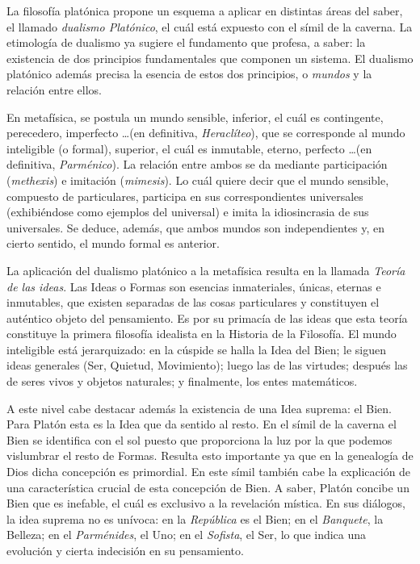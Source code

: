 \documentclass[10pt]{article}
\begin{document}
La filosofía platónica propone un esquema a aplicar en distintas áreas del saber, el llamado \textit{dualismo Platónico}, el cuál está expuesto
con el símil de la caverna. La etimología de dualismo ya sugiere el fundamento que profesa, a saber: la existencia de dos principios fundamentales que
componen un sistema. El dualismo platónico además precisa la esencia de estos dos principios, o \textit{mundos} y la relación entre ellos.

En metafísica, se postula un mundo sensible, inferior, el cuál es contingente, perecedero, imperfecto \dots (en definitiva, \textit{Heraclíteo}), que
se corresponde al mundo inteligible (o formal), superior, el cuál es inmutable, eterno, perfecto \dots (en definitiva, \textit{Parménico}). La relación
entre ambos se da mediante participación (\textit{methexis}) e imitación (\textit{mimesis}).
Lo cuál quiere decir que el mundo sensible, compuesto de particulares, participa en sus correspondientes universales (exhibiéndose como ejemplos del universal)
e imita la idiosincrasia de sus universales. Se deduce, además, que ambos mundos son independientes y, en cierto sentido, el mundo formal es anterior.

La aplicación del dualismo platónico a la metafísica resulta en la llamada \textit{Teoría de las ideas}. Las Ideas o Formas son esencias inmateriales, únicas, 
eternas e inmutables, que existen separadas de las cosas particulares y constituyen el auténtico objeto del pensamiento. Es por su primacía de las ideas que esta
teoría constituye la primera filosofía idealista en la Historia de la Filosofía. El mundo inteligible está jerarquizado: en la cúspide se halla la Idea del Bien; 
le siguen ideas generales (Ser, Quietud, Movimiento); luego las de las virtudes; después las de seres vivos y objetos naturales; y finalmente, los entes matemáticos.

A este nivel cabe destacar además la existencia de una Idea suprema: el Bien. Para Platón esta es la Idea que da sentido al resto. En el símil de la caverna
el Bien se identifica con el sol puesto que proporciona la luz por la que podemos vislumbrar el resto de Formas. Resulta esto importante ya que en la genealogía
de Dios dicha concepción es primordial. En este símil también cabe la explicación de una característica crucial de esta concepción de Bien. A saber, Platón concibe
un Bien que es inefable, el cuál es exclusivo a la revelación mística. En sus diálogos, la idea suprema no es unívoca: en la \textit{República} es el Bien; en el 
\textit{Banquete}, la Belleza; en el \textit{Parménides}, el Uno; en el \textit{Sofista}, el Ser, lo que indica una evolución y cierta indecisión en su pensamiento.
\end{document}
